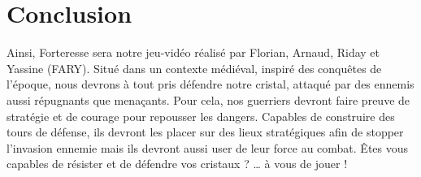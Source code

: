 \documentclass[a4paper, 12pt]{article}
\begin{document}
\section{Conclusion}
Ainsi, Forteresse sera notre jeu-vidéo réalisé par Florian, Arnaud, Riday et Yassine (FARY). Situé dans un contexte médiéval, inspiré des conquêtes de l’époque, nous devrons à tout pris défendre notre cristal, attaqué par des ennemis aussi répugnants que menaçants. Pour cela, nos guerriers devront faire preuve de stratégie et de courage pour repousser les dangers. Capables de construire des tours de défense, ils devront les placer sur des lieux stratégiques afin de stopper l’invasion ennemie mais ils devront aussi user de leur force au combat.
Êtes vous capables de résister et de défendre vos cristaux ?
… à vous de jouer !
\end{document}
